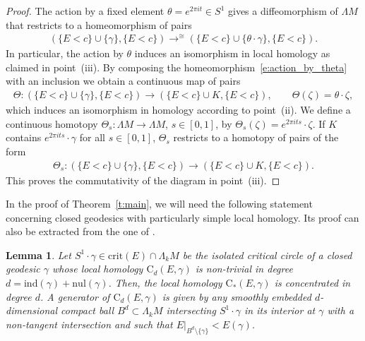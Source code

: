 \documentclass[reqno]{amsart}
\numberwithin{equation}{section}
\theoremstyle{personal}%
\newtheorem{lem}[thm]{Lemma}
\theoremstyle{definition}
\newcommand{\crit}{\mathrm{crit}}
\newcommand{\Loc}{\mathrm{C}}
\newcommand{\ind}{\mathrm{ind}}
\newcommand{\nul}{\mathrm{nul}}
\DeclareMathOperator*{\toup}{\longrightarrow}
\begin{document}
\begin{proof}
The action by a fixed element $\theta=e^{2\pi i t}\in S^1$ gives a diffeomorphism of $\Lambda M$ that restricts to a homeomorphism of pairs
\begin{align}\label{e:action_by_theta}
(\{E<c\}\cup\{\gamma\},\{E<c\}) \toup^{\cong} (\{E<c\}\cup\{\theta\cdot\gamma\},\{E<c\}).
\end{align}
In particular, the action by $\theta$ induces an isomorphism in local homology as claimed in point~(iii). By composing the homeomorphism~\eqref{e:action_by_theta} with an inclusion we obtain a continuous map of pairs
\begin{align*}
\Theta:(\{E<c\}\cup\{\gamma\},\{E<c\}) \to (\{E<c\}\cup K,\{E<c\}),\qquad \Theta(\zeta)=\theta\cdot\zeta,
\end{align*}
which induces an isomorphism in homology according to point~(ii). We define a continuous homotopy $\Theta_s:\Lambda M\to\Lambda M$, $s\in[0,1]$, by $\Theta_s(\zeta)=e^{2\pi i t s}\cdot\zeta$. If $K$ contains $e^{2\pi i t s}\cdot\gamma$ for all $s\in[0,1]$, $\Theta_s$ restricts to a homotopy of pairs of the form
\begin{align*}
\Theta_s:(\{E<c\}\cup\{\gamma\},\{E<c\}) \to (\{E<c\}\cup K,\{E<c\}).
\end{align*}
This proves the commutativity of the diagram in point~(iii).
\end{proof}

In the proof of Theorem~\ref{t:main}, we will need the following statement concerning closed geodesics with particularly simple local homology. Its proof can also be extracted from the one of \cite[Proposition~1]{Hingston:1993ou}.

\begin{lem}\label{l:generator_local_homology}
Let $S^1\cdot\gamma\in\crit(E)\cap\Lambda_kM$ be the isolated critical circle of a closed geodesic $\gamma$ whose local homology $\Loc_d(E,\gamma)$ is non-trivial in degree $d=\ind(\gamma)+\nul(\gamma)$. Then, the local homology $\Loc_*(E,\gamma)$ is concentrated in degree $d$. A generator of $\Loc_d(E,\gamma)$ is given by any smoothly embedded $d$-dimensional compact ball $B^d\subset\Lambda_k M$ intersecting $S^1\cdot\gamma$ in its interior at $\gamma$ with a non-tangent intersection and such that $E|_{B^d\setminus\{\gamma\}}<E(\gamma)$.
\end{lem}
\end{document}

